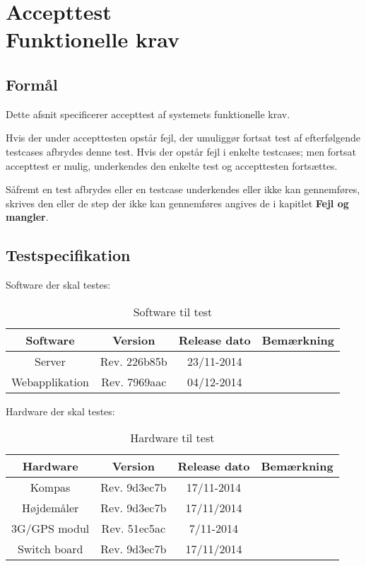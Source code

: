 \chapter{Accepttest \\ Funktionelle krav}

\vspace{-1cm}

\section*{Formål}
\vspace{-0.5cm}

Dette afsnit specificerer accepttest af systemets funktionelle krav. 

Hvis der under accepttesten opstår fejl, der umuliggør fortsat test af efterfølgende testcases afbrydes denne test. Hvis der opstår fejl i enkelte testcases; men fortsat accepttest er mulig, underkendes den enkelte test og accepttesten fortsættes.

Såfremt en test afbrydes eller en testcase underkendes eller ikke kan gennemføres, skrives den eller de step der ikke kan gennemføres angives de i kapitlet \textbf{Fejl og mangler}. 


\section*{Testspecifikation}
\vspace{-0.5cm}
Software der skal testes:
\begin{table}[H]
	\centering
		\begin{tabular}{|c|c|c|c|}
			\hline
			Software & Version & Release dato & Bemærkning \\ \hline
			Server & Rev. 226b85b & 23/11-2014 & \\ \hline			
			Webapplikation & Rev. 7969aac & 04/12-2014 &\\ \hline
		\end{tabular}
	\caption{Software til test}
\end{table}

Hardware der skal testes:
\begin{table}[H]
	\centering
		\begin{tabular}{|c|c|c|c|}
			\hline
			Hardware & Version & Release dato & Bemærkning \\ \hline
			Kompas 			& Rev. 9d3ec7b & 17/11-2014 &  \\ \hline			
			Højdemåler 		& Rev. 9d3ec7b & 17/11/2014 &  \\ \hline
			3G/GPS modul 	& Rev. 51ec5ac & 7/11-2014 &  \\ \hline
			Switch board 	& Rev. 9d3ec7b & 17/11/2014 &  \\ \hline
		\end{tabular}
	\caption{Hardware til test}
\end{table}

